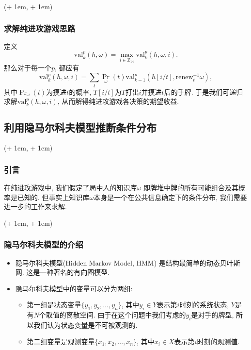 \documentclass[xcolor=dvipsnames]{ctexbeamer}
\newcommand{\FrameTextCrono}[1]{
    \begin{textblock*}{\paperwidth}(\textwidth + 1em, \textheight + 1em)
        #1
    \end{textblock*}
}
\let\oldframe\frame
\let\oldendframe\endframe
\renewenvironment{frame}
    {\oldframe\FrameTextCrono{\small\color{blue}{\crono}}}
    {\oldendframe}
\newcommand{\hand}{h}
\newcommand{\base}{\omega}
\begin{document}
    \begin{frame}
        \frametitle{求解纯进攻游戏思路}
        定义
        \[\mathrm{val}_{k}^{p}(\hand, \base)=
        \max_{i\in\mathbb{Z}_{14}}{\mathrm{val}_{k}^{p}(\hand, \base, i)}.\]
        那么对于每一个$p$, 都应有
        \[\mathrm{val}_{k}^{p}(\hand, \base, i)=
        \sum_{t}{\Pr_{\base}}(t)\mathrm{val}_{k-1}^{p}(\hand[i/t],
        \mathrm{renew}_{t}^{-1}{\base}),\]
        其中$\Pr_{\base}(t)$为摸进$t$的概率,
        $T[i/t]$为$T$打出$i$并摸进$t$后的手牌.
        于是我们可递归求解$\mathrm{val}_{k}^{p}(\hand, \base, i)$,
        从而解得纯进攻游戏各决策的期望收益.
    \end{frame}

    \subsection{利用隐马尔科夫模型推断条件分布}

    \begin{frame}
        \frametitle{引言}
        在纯进攻游戏中, 我们假定了局中人的知识库$\base$
        即牌堆中牌的所有可能组合及其概率是已知的.
        但事实上知识库$\base$本身是一个在公共信息确定下的条件分布,
        我们需要进一步的工作来求解.
    \end{frame}

    \begin{frame}
        \frametitle{隐马尔科夫模型的介绍}
        \begin{itemize}
            \item 隐马尔科夫模型(Hidden Markov Model, HMM)
                是结构最简单的动态贝叶斯网.
                这是一种著名的有向图模型.
            \item 隐马尔科夫模型中的变量可以分为两组:
            \begin{itemize}
            \item 第一组是状态变量$\{y_{1}, y_{2}, \dotsc, y_{n}\}$,
                其中$y_{i}\in Y$表示第$i$时刻的系统状态,
                $Y$是有$N$个取值的离散空间.
                由于在这个问题中我们考虑的$y_{i}$是对手的牌型,
                所以我们认为状态变量是不可被观测的.
            \item 第二组变量是观测变量$\{x_{1}, x_{2}, \dotsc, x_{n}\}$,
                其中$x_{i}\in X$表示第$i$时刻的观测值.
            \end{itemize}
        \end{itemize}
    \end{frame}
\end{document}
